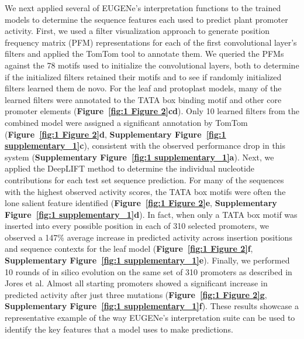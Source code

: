 We next applied several of EUGENe’s interpretation functions to the trained models to determine the sequence features each used to predict plant promoter activity. First, we used a filter visualization approach\cite{Minnoye2020-vz} to generate position frequency matrix (PFM) representations for each of the first convolutional layer’s filters and applied the TomTom\cite{Gupta2007-zw} tool to annotate them. We queried the PFMs against the 78 motifs used to initialize the convolutional layers, both to determine if the initialized filters retained their motifs and to see if randomly initialized filters learned them de novo. For the leaf and protoplast models, many of the learned filters were annotated to the TATA box binding motif and other core promoter elements (\textbf{Figure~\ref{fig:1 Figure 2}c}\textbf{d}). Only 10 learned filters from the combined model were assigned a significant annotation by TomTom (\textbf{Figure~\ref{fig:1 Figure 2}d}, \textbf{Supplementary Figure~\ref{fig:1 supplementary_1}c}), consistent with the observed performance drop in this system (\textbf{Supplementary Figure~\ref{fig:1 supplementary_1}a}). Next, we applied the DeepLIFT method\cite{Shrikumar2016-lf} to determine the individual nucleotide contributions for each test set sequence prediction. For many of the sequences with the highest observed activity scores, the TATA box motifs were often the lone salient feature identified (\textbf{Figure~\ref{fig:1 Figure 2}e}, \textbf{Supplementary Figure~\ref{fig:1 supplementary_1}d}). In fact, when only a TATA box motif was inserted into every possible position in each of 310 selected promoters, we observed a 147\% average increase in predicted activity across insertion positions and sequence contexts for the leaf model (\textbf{Figure~\ref{fig:1 Figure 2}f}, \textbf{Supplementary Figure~\ref{fig:1 supplementary_1}e}). Finally, we performed 10 rounds of in silico evolution on the same set of 310 promoters as described in Jores et al. Almost all starting promoters showed a significant increase in predicted activity after just three mutations (\textbf{Figure~\ref{fig:1 Figure 2}g}, \textbf{Supplementary Figure~\ref{fig:1 supplementary_1}f}). These results showcase a representative example of the way EUGENe’s interpretation suite can be used to identify the key features that a model uses to make predictions.

\clearpage

